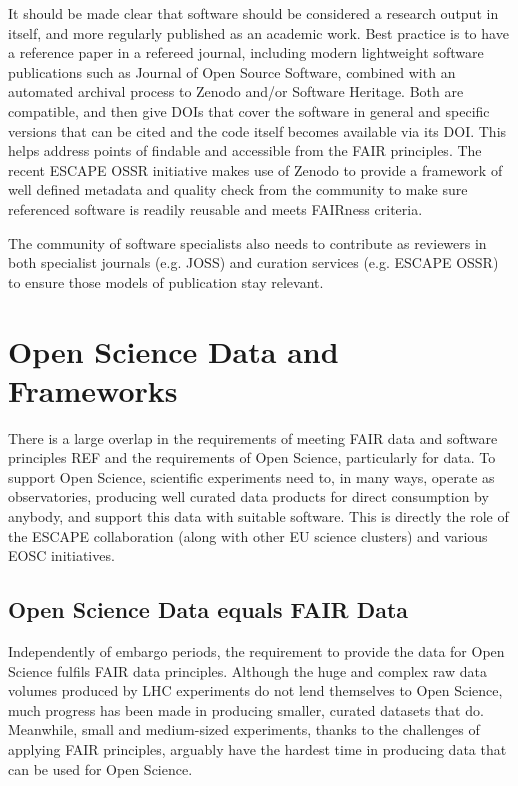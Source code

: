 It should be made clear that software should be considered a research output in itself, and more regularly published as an academic work. Best practice is to have a reference paper in a refereed journal, including modern lightweight software publications such as Journal of Open Source Software, combined with an automated archival process to Zenodo and/or Software Heritage. Both are compatible, and then give DOIs that cover the software in general and specific versions that can be cited and the code itself becomes available via its DOI. This helps address points of findable and accessible from the FAIR principles. The recent ESCAPE OSSR initiative makes use of Zenodo to provide a framework of well defined metadata and quality check from the community to make sure referenced software is readily reusable and meets FAIRness criteria.

The community of software specialists also needs to contribute as reviewers in both specialist journals (e.g. JOSS) and curation services (e.g. ESCAPE OSSR) to ensure those models of publication stay relevant.


\section{Open Science Data and Frameworks}

There is a large overlap in the requirements of meeting FAIR data and software principles REF
and the requirements of Open Science, particularly for data. To support Open Science, scientific experiments need to, in many ways, operate as observatories, producing well curated data products for direct consumption by anybody, and support this data with suitable software. This is directly the role of the ESCAPE collaboration (along with other EU science clusters) and various EOSC initiatives.


\subsection{Open Science Data equals FAIR Data}

Independently of embargo periods, the requirement to provide the data for Open Science fulfils FAIR data principles.  Although the huge and complex raw data volumes produced by LHC experiments do not lend themselves to Open Science, much progress has been made in producing smaller, curated datasets that do.  Meanwhile, small and medium-sized experiments, thanks to the challenges of applying FAIR principles, arguably have the hardest time in producing data that can be used for Open Science.

